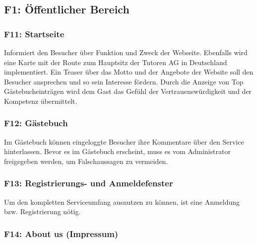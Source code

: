 \documentclass[10pt,a4paper]{scrartcl}
\begin{document}
\subsection{F1: Öffentlicher Bereich}
\subsubsection*{F11: Startseite}

Informiert den Besucher über Funktion und Zweck der Webseite. Ebenfalls wird eine Karte mit der Route zum Hauptsitz der Tutoren AG in Deutschland implementiert. Ein Teaser über das Motto und der Angebote der Website soll den Besucher ansprechen und so sein Interesse fördern. Durch die Anzeige von Top Gästebucheinträgen wird dem Gast das Gefühl der Vertrauenswürdigkeit und der Kompetenz übermittelt.

\subsubsection*{F12: Gästebuch}

Im Gästebuch können eingeloggte Besucher ihre Kommentare über den Service hinterlassen. Bevor es im Gästebuch erscheint, muss es vom Administrator freigegeben werden, um Falschaussagen zu vermeiden.


%

\subsubsection*{F13: Registrierungs- und Anmeldefenster}

Um den kompletten Serviceumfang ausnutzen zu können, ist eine Anmeldung bzw. Registrierung nötig.

\subsubsection*{F14: About us (Impressum)}
\end{document}
